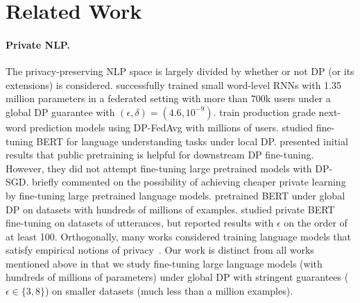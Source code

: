 \section{Related Work}

\paragraph{Private NLP.}
The privacy-preserving NLP space is largely divided by whether or not DP (or its extensions) is considered.
\cite{mcmahan2017learning} successfully trained small word-level RNNs with 1.35 million parameters in a federated setting with more than 700k users under a global DP guarantee with $(\epsilon, \delta) = (4.6, 10^{-9})$.
\cite{ramaswamy2020training} train production grade next-word prediction models using DP-FedAvg with millions of users.
\cite{qu2021privacy} studied fine-tuning BERT for language understanding tasks under local DP. 
\cite{kerrigan2020differentially} presented initial results that public pretraining is helpful for downstream DP fine-tuning.
However, they did not attempt fine-tuning large pretrained models with DP-SGD.
\cite{bommasani2021opportunities} briefly commented on the possibility of achieving cheaper private learning by fine-tuning large pretrained language models. 
\cite{anil2021large} pretrained BERT under global DP on datasets with hundreds of millions of examples. 
\cite{dupuy2021efficient} studied private BERT fine-tuning on datasets of utterances, but reported results with $\epsilon$ on the order of at least 100. 
Orthogonally, many works considered training language models that satisfy empirical notions of privacy~\citep{xu2021utilitarian,coavoux2018privacy,mireshghallah2021privacy,melamud2019towards}.
Our work is distinct from all works mentioned above in that we study fine-tuning large language models (with hundreds of millions of parameters) under global DP with stringent guarantees ($\epsilon \in \{3, 8\}$) on smaller datasets (much less than a million examples).
